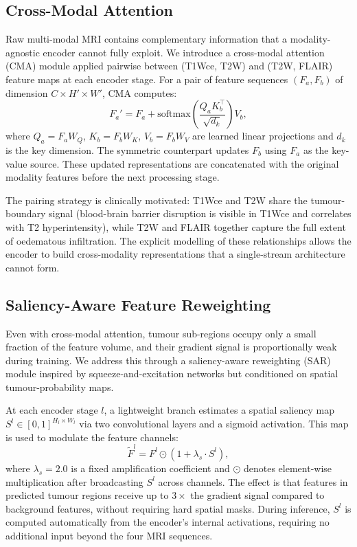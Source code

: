 \documentclass[conference]{IEEEtran}
\begin{document}
\subsection{Cross-Modal Attention}

Raw multi-modal MRI contains complementary information that a
modality-agnostic encoder cannot fully exploit. We introduce a
cross-modal attention (CMA) module applied pairwise between
(T1Wce, T2W) and (T2W, FLAIR) feature maps at each encoder stage.
For a pair of feature sequences $(F_a, F_b)$ of dimension
$C \times H' \times W'$, CMA computes:
\begin{equation}
  F_a' = F_a + \mathrm{softmax}\!\left(
    \frac{Q_a K_b^\top}{\sqrt{d_k}}
  \right) V_b ,
\end{equation}
where $Q_a = F_a W_Q$, $K_b = F_b W_K$, $V_b = F_b W_V$ are
learned linear projections and $d_k$ is the key dimension.
The symmetric counterpart updates $F_b$ using $F_a$ as the
key-value source. These updated representations are concatenated
with the original modality features before the next processing
stage.

The pairing strategy is clinically motivated: T1Wce and T2W share
the tumour-boundary signal (blood-brain barrier disruption is visible
in T1Wce and correlates with T2 hyperintensity), while T2W and FLAIR
together capture the full extent of oedematous infiltration. The
explicit modelling of these relationships allows the encoder to build
cross-modality representations that a single-stream architecture
cannot form.

\subsection{Saliency-Aware Feature Reweighting}

Even with cross-modal attention, tumour sub-regions occupy only
a small fraction of the feature volume, and their gradient signal
is proportionally weak during training. We address this through a
saliency-aware reweighting (SAR) module inspired by
squeeze-and-excitation networks \cite{hu2018senet} but conditioned
on spatial tumour-probability maps.

At each encoder stage $l$, a lightweight branch estimates a spatial
saliency map $S^l \in [0,1]^{H_l \times W_l}$ via two convolutional
layers and a sigmoid activation. This map is used to modulate the
feature channels:
\begin{equation}
  \tilde{F}^l = F^l \odot \left(1 + \lambda_s \cdot S^l\right) ,
\end{equation}
where $\lambda_s = 2.0$ is a fixed amplification coefficient
and $\odot$ denotes element-wise multiplication after broadcasting
$S^l$ across channels. The effect is that features in predicted
tumour regions receive up to $3\times$ the gradient signal compared
to background features, without requiring hard spatial masks.
During inference, $S^l$ is computed automatically from the
encoder's internal activations, requiring no additional input
beyond the four MRI sequences.
\end{document}
